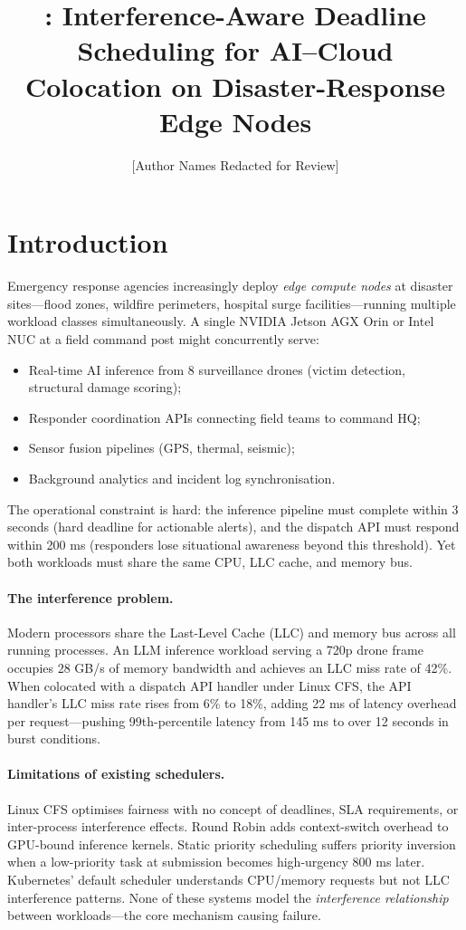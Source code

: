 \documentclass[sigconf,10pt]{acmart}
\title{\sys: Interference-Aware Deadline Scheduling for AI–Cloud
       Colocation on Disaster-Response Edge Nodes}
\author{[Author Names Redacted for Review]}
\affiliation{\institution{[Institution Redacted]}}
\begin{document}
\maketitle

\section{Introduction}

Emergency response agencies increasingly deploy \emph{edge compute nodes}
at disaster sites—flood zones, wildfire perimeters, hospital surge
facilities—running multiple workload classes simultaneously. A single
NVIDIA Jetson AGX Orin or Intel NUC at a field command post might
concurrently serve:
\begin{itemize}
  \item Real-time AI inference from 8 surveillance drones (victim
        detection, structural damage scoring);
  \item Responder coordination APIs connecting field teams to command HQ;
  \item Sensor fusion pipelines (GPS, thermal, seismic);
  \item Background analytics and incident log synchronisation.
\end{itemize}

The operational constraint is hard: the inference pipeline must complete
within 3 seconds (hard deadline for actionable alerts), and the dispatch
API must respond within 200 ms (responders lose situational awareness
beyond this threshold). Yet both workloads must share the same CPU,
LLC cache, and memory bus.

\paragraph{The interference problem.} Modern processors share the Last-Level
Cache (LLC) and memory bus across all running processes. An LLM inference
workload serving a 720p drone frame occupies 28 GB/s of memory bandwidth
and achieves an LLC miss rate of 42\%. When colocated with a dispatch API
handler under Linux CFS, the API handler's LLC miss rate rises from 6\% to
18\%, adding 22 ms of latency overhead per request—pushing 99th-percentile
latency from 145 ms to over 12 seconds in burst conditions.

\paragraph{Limitations of existing schedulers.} Linux CFS optimises
fairness with no concept of deadlines, SLA requirements, or inter-process
interference effects. Round Robin adds context-switch overhead to
GPU-bound inference kernels. Static priority scheduling suffers priority
inversion when a low-priority task at submission becomes high-urgency 800
ms later. Kubernetes' default scheduler understands CPU/memory requests
but not LLC interference patterns. None of these systems model the
\emph{interference relationship} between workloads—the core mechanism
causing failure.
\end{document}
